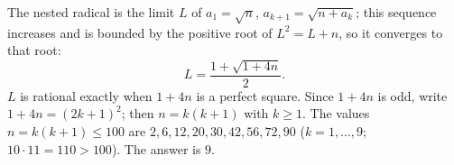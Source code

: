 The nested radical is the limit $L$ of $a_1=\sqrt n$, $a_{k+1}=\sqrt{n+a_k}$; this sequence increases and is bounded by the positive root of $L^2=L+n$, so it converges to that root:
\[
L=\dfrac{1+\sqrt{1+4n}}{2}.
\]
$L$ is rational exactly when $1+4n$ is a perfect square. Since $1+4n$ is odd, write $1+4n=(2k+1)^2$; then $n=k(k+1)$ with $k\ge1$. The values $n=k(k+1)\le100$ are $2,6,12,20,30,42,56,72,90$ ($k=1,\dots,9$; $10\cdot11=110>100$). The answer is $\boxed{9}$.
